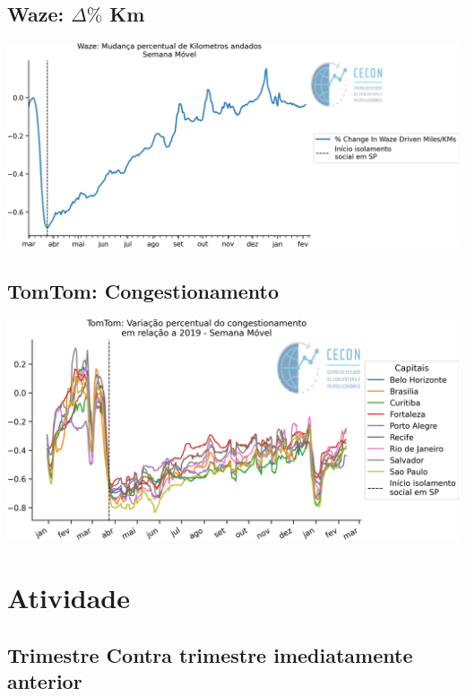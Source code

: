 \documentclass{SelfArx}
\begin{document}
\subsection*{Waze: \(\Delta \%\) Km}
\label{sec:org0cdf910}

\begin{center}
\includegraphics[width=.9\linewidth]{./figs/Granulares/Waze_Brasil.png}
\end{center}

\subsection*{TomTom: Congestionamento}
\label{sec:org630a31b}

\begin{center}
\includegraphics[width=.9\linewidth]{./figs/Granulares/TomTom_Brasil.png}
\end{center}

\section*{Atividade}
\label{sec:org371ceee}



\subsection*{Trimestre Contra trimestre imediatamente anterior}
\label{sec:orgc7d434c}
\end{document}
